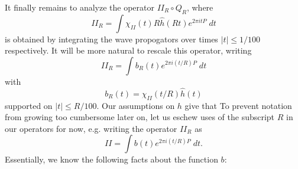 It finally remains to analyze the operator $II_R \circ Q_R$, where
%
\[ II_R = \int \chi_{II}(t) R \widehat{h}(Rt) e^{2 \pi i t P}\; dt \] %
%
is obtained by integrating the wave propogators over times $|t| \leq 1/100$ respectively. It will be more natural to rescale this operator, writing
%
\[ II_R = \int b_R(t) e^{2 \pi i (t/R) P}\; dt \]
%
with
%
\[ b_R(t) = \chi_{II}(t / R) \widehat{h}(t) \]
%
supported on $|t| \leq R / 100$. Our assumptions on $h$ give that
%
%
%
%
To prevent notation from growing too cumbersome later on, let us eschew uses of the subscript $R$ in our operators for now, e.g. writing the operator $II_R$ as
%
\[ II = \int b(t) e^{2 \pi i (t/R) P}\; dt. \]
%
Essentially, we know the following facts about the function $b$:
%
